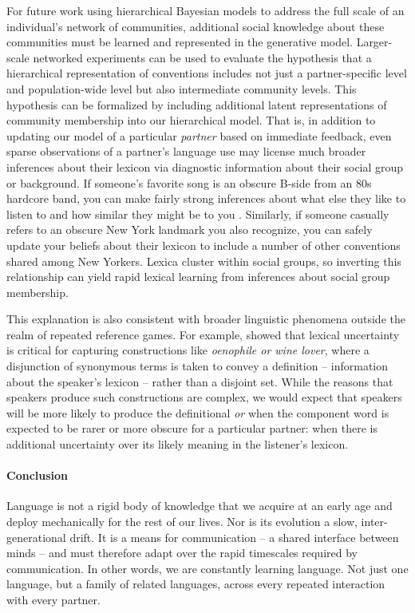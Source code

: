 For future work using hierarchical Bayesian models to address the full scale of an individual's  network of communities, additional social knowledge about these communities must be learned and represented in the generative model.
Larger-scale networked experiments can be used to evaluate the hypothesis that a hierarchical representation of conventions includes not just a partner-specific level and population-wide level but also intermediate community levels. 
This hypothesis can be formalized by including additional latent representations of community membership into our hierarchical model.
That is, in addition to updating our model of a particular \emph{partner} based on immediate feedback, even sparse observations of a partner's language use may license much broader inferences about their lexicon via diagnostic information about their social group or background. 
If someone's favorite song is an obscure B-side from an 80s hardcore band, you can make fairly strong inferences about what else they like to listen to and how similar they might be to you \cite{VelezEtAl16_Overlaps, GershmanEtAl17_StructureSocialInfluence}. 
Similarly, if someone casually refers to an obscure New York landmark you also recognize, you can safely update your beliefs about their lexicon to include a number of other conventions shared among New Yorkers. 
Lexica cluster within social groups, so inverting this relationship can yield rapid lexical learning from inferences about social group membership.

This explanation is also consistent with broader linguistic phenomena outside the realm of repeated reference games. 
For example,  showed that lexical uncertainty is critical for capturing constructions like \emph{oenophile or wine lover}, where a disjunction of synonymous terms is taken to convey a definition -- information about the speaker's lexicon -- rather than a disjoint set. 
While the reasons that speakers produce such constructions are complex, we would expect that speakers will be more likely to produce the definitional \emph{or} when the component word is expected to be rarer or more obscure for a particular partner: when there is additional uncertainty over its likely meaning in the listener's lexicon.

\paragraph{Conclusion}

Language is not a rigid body of knowledge that we acquire at an early age and deploy mechanically for the rest of our lives. 
Nor is its evolution a slow, inter-generational drift. 
It is a means for communication -- a shared interface between minds -- and must therefore adapt over the rapid timescales required by communication. 
In other words, we are constantly learning language. 
Not just one language, but a family of related languages, across every repeated interaction with every partner. 

